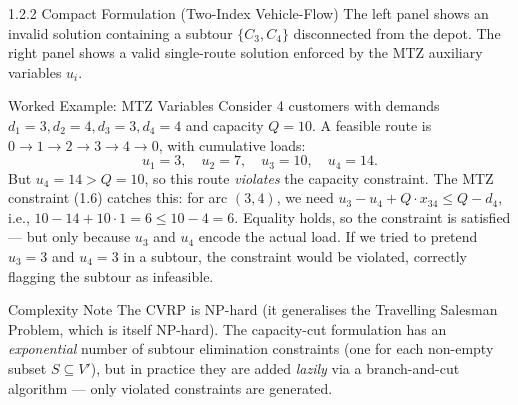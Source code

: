 \documentclass[aspectratio=169,10pt]{beamer}
\begin{document}
\begin{frame}[allowframebreaks]{1.2.2 Compact Formulation (Two-Index Vehicle-Flow)}
The left panel shows an invalid solution containing a subtour $\{C_3, C_4\}$
disconnected from the depot.  The right panel shows a valid single-route solution
enforced by the MTZ auxiliary variables $u_i$.

\framebreak

\begin{exampleblock}{Worked Example: MTZ Variables}
Consider 4 customers with demands $d_1=3, d_2=4, d_3=3, d_4=4$ and capacity $Q=10$.
A feasible route is $0 \to 1 \to 2 \to 3 \to 4 \to 0$, with cumulative loads:
\[
  u_1 = 3,\quad u_2 = 7,\quad u_3 = 10,\quad u_4 = 14.
\]
But $u_4 = 14 > Q = 10$, so this route \emph{violates} the capacity constraint.
The MTZ constraint (1.6) catches this: for arc $(3,4)$, we need
$u_3 - u_4 + Q \cdot x_{34} \leq Q - d_4$,
i.e., $10 - 14 + 10 \cdot 1 = 6 \leq 10 - 4 = 6$.  Equality holds, so the
constraint is satisfied --- but only because $u_3$ and $u_4$ encode the actual load.
If we tried to pretend $u_3 = 3$ and $u_4 = 3$ in a subtour, the constraint would
be violated, correctly flagging the subtour as infeasible.
\end{exampleblock}

\begin{alertblock}{Complexity Note}
The CVRP is NP-hard (it generalises the Travelling Salesman Problem, which is itself
NP-hard).  The capacity-cut formulation has an \emph{exponential} number of subtour
elimination constraints (one for each non-empty subset $S \subseteq V'$), but in
practice they are added \emph{lazily} via a branch-and-cut algorithm --- only
violated constraints are generated.
\end{alertblock}

\end{frame}
\end{document}
